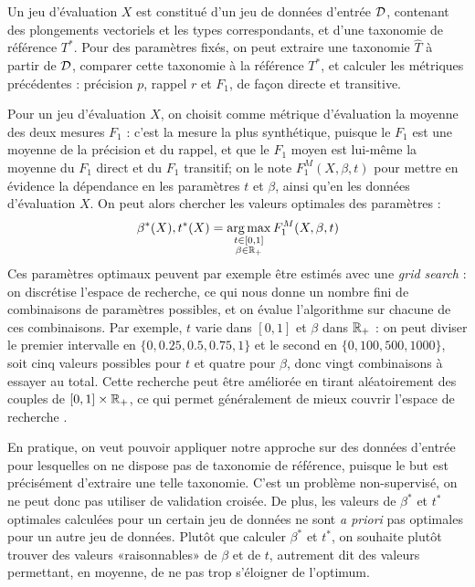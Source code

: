 Un jeu d'évaluation $X$ est constitué d'un jeu de données d'entrée $\cal{D}$, contenant des plongements vectoriels et les types correspondants, et d'une taxonomie de référence $T^*$. Pour des paramètres fixés, on peut extraire une taxonomie $\hat{T}$ à partir de $\cal{D}$, comparer cette taxonomie à la référence $T^*$, et calculer les métriques précédentes : précision $p$, rappel $r$ et $F_1$, de façon directe et transitive. 

Pour un jeu d'évaluation $X$, on choisit comme métrique d'évaluation la moyenne des deux mesures $F_1$ : c'est la mesure la plus synthétique, puisque le $F_1$ est une moyenne de la précision et du rappel, et que le $F_1$ moyen est lui-même la moyenne du $F_1$ direct et du $F_1$ transitif; on le note $F_1^M(X, \beta, t)$ pour mettre en évidence la dépendance en les paramètres $t$ et $\beta$, ainsi qu'en les données d'évaluation $X$.
On peut alors chercher les valeurs optimales des paramètres :
\begin{equation}
  \beta^*(X), t^*(X) = \argmax_{\substack{t \in [0, 1] \\ \beta \in \R_+}} F_1^M(X, \beta, t)
\end{equation}
Ces paramètres optimaux peuvent par exemple être estimés avec une \textit{grid search} : on discrétise l'espace de recherche, ce qui nous donne un nombre fini de combinaisons de paramètres possibles, et on évalue l'algorithme sur chacune de ces combinaisons. Par exemple, $t$ varie dans $[0, 1]$ et $\beta$ dans $\R_+$ : on peut diviser le premier intervalle en $\{0, 0.25, 0.5, 0.75, 1\}$ et le second en $\{0, 100, 500, 1000 \}$, soit cinq valeurs possibles pour $t$ et quatre pour $\beta$, donc vingt combinaisons à essayer au total. Cette recherche peut être améliorée en tirant aléatoirement des couples de $[0, 1] \times \R_+$, ce qui permet généralement de mieux couvrir l'espace de recherche \cite{bergstra2012random}.

En pratique, on veut pouvoir appliquer notre approche sur des données d'entrée pour lesquelles on ne dispose pas de taxonomie de référence, puisque le but est précisément d'extraire une telle taxonomie. C'est un problème non-supervisé, on ne peut donc pas utiliser de validation croisée.
De plus, les valeurs de $\beta^*$ et $t^*$ optimales calculées pour un certain jeu de données ne sont \textit{a priori} pas optimales pour un autre jeu de données. 
Plutôt que calculer $\beta^*$ et $t^*$, on souhaite plutôt trouver des valeurs «raisonnables» de $\beta$ et de $t$, autrement dit des valeurs permettant, en moyenne, de ne pas trop s'éloigner de l'optimum.


